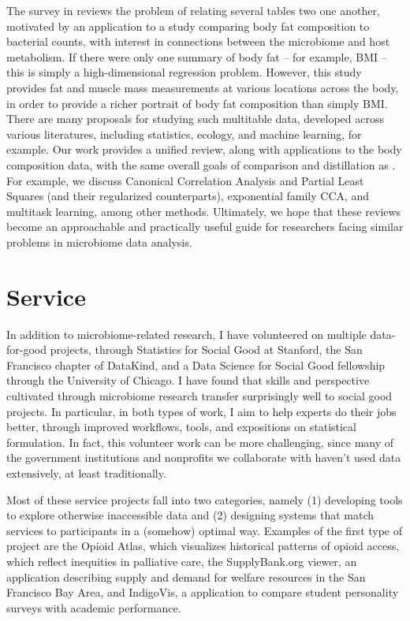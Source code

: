 \documentclass{article}
\begin{document}
The survey in \citep{sankaran2017survey} reviews the problem of relating several
tables two one another, motivated by an application to a study comparing body
fat composition to bacterial counts, with interest in connections between the
microbiome and host metabolism. If there were only one summary of body fat --
for example, BMI -- this is simply a high-dimensional regression problem.
However, this study provides fat and muscle mass measurements at various
locations across the body, in order to provide a richer portrait of body fat
composition than simply BMI. There are many proposals for studying such
multitable data, developed across various literatures, including statistics,
ecology, and machine learning, for example. Our work provides a unified review,
along with applications to the body composition data, with the same overall
goals of comparison and distillation as \citep{sankaran2017inference}. For
example, we discuss Canonical Correlation Analysis and Partial Least Squares
(and their regularized counterparts), exponential family CCA, and multitask
learning, among other methods. Ultimately, we hope that these reviews become an
approachable and practically useful guide for researchers facing similar
problems in microbiome data analysis.

\section{Service}

In addition to microbiome-related research, I have volunteered on multiple
data-for-good projects, through Statistics for Social Good at Stanford, the San
Francisco chapter of DataKind, and a Data Science for Social Good fellowship
through the University of Chicago. I have found that skills and perspective
cultivated through microbiome research transfer surprisingly well to social good
projects. In particular, in both types of work, I aim to help experts do their
jobs better, through improved workflows, tools, and expositions on statistical
formulation. In fact, this volunteer work can be more challenging, since many of
the government institutions and nonprofits we collaborate with haven't
used data extensively, at least traditionally.

Most of these service projects fall into two categories, namely (1) developing
tools to explore otherwise inaccessible data and (2) designing systems that
match services to participants in a (somehow) optimal way. Examples of the first
type of project are the Opioid Atlas, which visualizes historical patterns of
opioid access, which reflect inequities in palliative care, the SupplyBank.org
viewer, an application describing supply and demand for welfare resources in the
San Francisco Bay Area, and IndigoVis, a application to compare student
personality surveys with academic performance.
\end{document}
